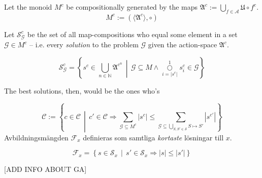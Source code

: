 \documentclass[10pt,a4paper]{article}
\begin{document}
Let the monoid \(M^c\) be compositionally generated by the maps \(\mathfrak{A}^c := \bigcup_{f\in\mathcal{A}} \mathfrak{U}\circ f^c\).
\begin{equation}
		M^c:=\left(\langle\mathfrak{A}^c\rangle,\circ\right)
\end{equation}

Let \(\mathscr{S}^c_\mathcal{G}\) be the set of all map-compositions who equal some element in a set \(\mathcal{G}\in M^c\) -- i.e. every \textit{solution} to the problem \(\mathcal{G}\) given the action-space \(\mathfrak{A}^c\).

\begin{equation}
		\mathscr{S}^c_\mathcal{G} = \left\{ s^c \in \bigcup_{n\in \mathbb{N}}\mathfrak{A}^{c^n} \,\middle|\, \mathcal{G}\subseteq M\wedge\overset{1}{\underset{i=|s^c|}\bigcirc} s^c_i \in \mathcal{G} \right\}
\end{equation}


The best solutions, then, would be the ones who's 

\begin{equation}
		\mathscr{C} := \left\{ c \in \mathcal{C} \,\middle|\, c'\in\mathcal{C} \Rightarrow \sum_{\mathcal{G}\subseteq M^c} \left|s^{c}\right| \le \sum_{\mathcal{G}\subseteq \underset {S,S'\in\mathcal{S}} \bigcup S\mapsto S'} \left|s^{c'}\right| \right\}
\end{equation}
Avbildningsmängden \(\mathscr{F}_x\) definieras som samtliga \textit{kortaste} lösningar till \(x\).

\begin{equation}
		\mathscr{F}_x=\left\{s\in\mathscr{S}_x \,\middle|\, s'\in \mathscr{S}_x \Rightarrow |s|\le|s'|\right\}
\end{equation}

[ADD INFO ABOUT GA]
\end{document}
